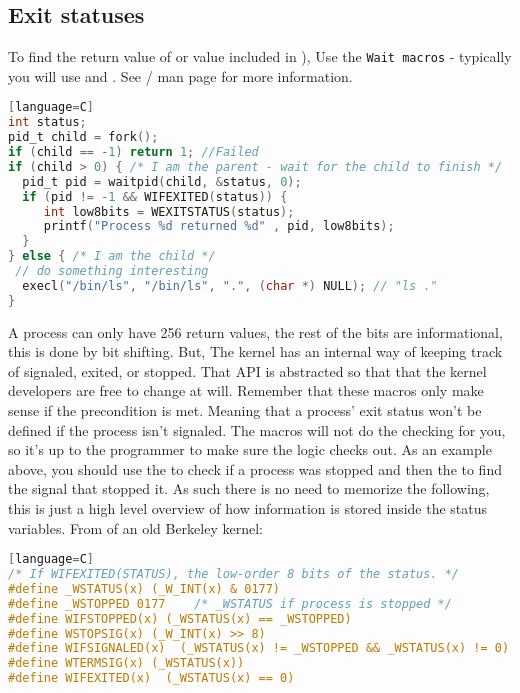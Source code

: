 \subsection{Exit statuses}

To find the return value of  or value included in ), Use the \texttt{Wait macros} - typically you will use  and  . See / man page for more information.

\begin{lstlisting}[language=C][language=C]
int status;
pid_t child = fork();
if (child == -1) return 1; //Failed
if (child > 0) { /* I am the parent - wait for the child to finish */
  pid_t pid = waitpid(child, &status, 0);
  if (pid != -1 && WIFEXITED(status)) {
     int low8bits = WEXITSTATUS(status);
     printf("Process %d returned %d" , pid, low8bits);
  }
} else { /* I am the child */
 // do something interesting
  execl("/bin/ls", "/bin/ls", ".", (char *) NULL); // "ls ."
}
\end{lstlisting}

A process can only have 256 return values, the rest of the bits are informational, this is done by bit shifting. But, The kernel has an internal way of keeping track of signaled, exited, or stopped. That API is abstracted so that that the kernel developers are free to change at will. Remember that these macros only make sense if the precondition is met. Meaning that a process' exit status won't be defined if the process isn't signaled. The macros will not do the checking for you, so it's up to the programmer to make sure the logic checks out. As an example above, you should use the  to check if a process was stopped and then the  to find the signal that stopped it. As such there is no need to memorize the following, this is just a high level overview of how information is stored inside the status variables. From  of an old Berkeley kernel\cite{sys/wait.h}:

\begin{lstlisting}[language=C][language=C]
/* If WIFEXITED(STATUS), the low-order 8 bits of the status. */
#define _WSTATUS(x) (_W_INT(x) & 0177)
#define _WSTOPPED 0177    /* _WSTATUS if process is stopped */
#define WIFSTOPPED(x) (_WSTATUS(x) == _WSTOPPED)
#define WSTOPSIG(x) (_W_INT(x) >> 8)
#define WIFSIGNALED(x)  (_WSTATUS(x) != _WSTOPPED && _WSTATUS(x) != 0)
#define WTERMSIG(x) (_WSTATUS(x))
#define WIFEXITED(x)  (_WSTATUS(x) == 0)
\end{lstlisting}

